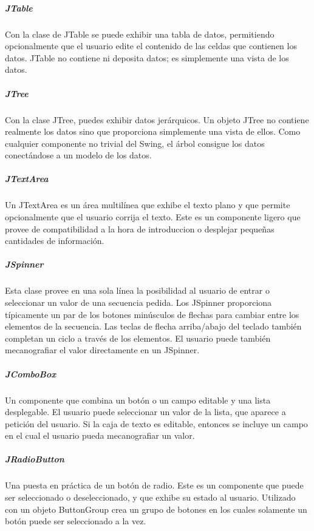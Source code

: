 \begin{description}
\subparagraph{JTable}
Con la clase de JTable se puede exhibir una tabla de datos, permitiendo opcionalmente que el usuario edite el contenido de las celdas que contienen los datos.  JTable no contiene ni deposita datos; es simplemente una vista de los datos.

\subparagraph{JTree}
Con la clase JTree, puedes exhibir datos jer\'arquicos.  Un objeto JTree no contiene realmente los datos sino que proporciona simplemente una vista de ellos.  Como cualquier componente no trivial del Swing, el \'arbol consigue los datos conect\'andose a un modelo de los datos.

\subparagraph{JTextArea}
Un JTextArea es un \'area multil\'inea que exhibe el texto plano y que permite opcionalmente que el usuario corrija el texto. Este es un componente ligero que provee de compatibilidad a la hora de introduccion o desplejar peque\~nas cantidades de informaci\'on.

\subparagraph{JSpinner}
Esta clase provee en una sola l\'inea la posibilidad al usuario de entrar o seleccionar un valor de una secuencia pedida. Los JSpinner proporciona t\'ipicamente un par de los botones min\'usculos de  flechas para cambiar entre los elementos de la secuencia.  Las teclas de flecha arriba/abajo del teclado tambi\'en completan un ciclo a trav\'es de los elementos. El usuario puede tambi\'en mecanografiar el valor directamente en un JSpinner.

\subparagraph{JComboBox}
Un componente que combina un bot\'on o un campo editable y una lista desplegable.  El usuario puede seleccionar un valor de la lista, que aparece a petici\'on del usuario.  Si la caja de texto es editable, entonces se incluye un campo en el cual el usuario pueda mecanografiar un valor.

\subparagraph{JRadioButton}
Una puesta en pr\'actica de un bot\'on de radio.  Este es un componente que puede ser seleccionado o deseleccionado, y que exhibe su estado al usuario.  Utilizado con un objeto ButtonGroup crea un grupo de botones en los cuales solamente un bot\'on puede ser seleccionado a la vez.

\end{description}


